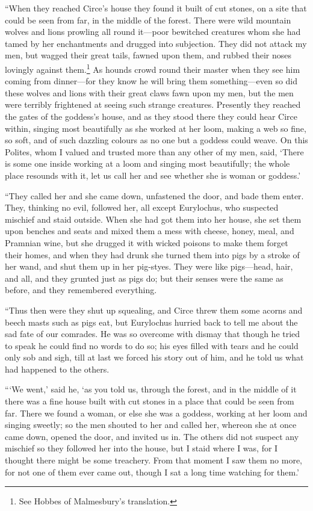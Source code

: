 “When they reached Circe’s house they found it built of cut stones, on a site
that could be seen from far, in the middle of the forest. There were wild
mountain wolves and lions prowling all round it—poor bewitched creatures whom
she had tamed by her enchantments and drugged into subjection. They did not
attack my men, but wagged their great tails, fawned upon them, and rubbed their
noses lovingly against them.\footnote{See Hobbes of Malmesbury’s translation.} As hounds crowd round their master
when they see him coming from dinner—for they know he will bring them
something—even so did these wolves and lions with their great claws fawn upon
my men, but the men were terribly frightened at seeing such strange creatures.
Presently they reached the gates of the goddess’s house, and as they stood
there they could hear Circe within, singing most beautifully as she worked at
her loom, making a web so fine, so soft, and of such dazzling colours as no one
but a goddess could weave. On this Polites, whom I valued and trusted more than
any other of my men, said, ‘There is some one inside working at a loom and
singing most beautifully; the whole place resounds with it, let us call her and
see whether she is woman or goddess.’

“They called her and she came down, unfastened the door, and bade them enter.
They, thinking no evil, followed her, all except Eurylochus, who suspected
mischief and staid outside. When she had got them into her house, she set them
upon benches and seats and mixed them a mess with cheese, honey, meal, and
Pramnian wine, but she drugged it with wicked poisons to make them forget their
homes, and when they had drunk she turned them into pigs by a stroke of her
wand, and shut them up in her pig-styes. They were like pigs—head, hair, and
all, and they grunted just as pigs do; but their senses were the same as
before, and they remembered everything.

“Thus then were they shut up squealing, and Circe threw them some acorns and
beech masts such as pigs eat, but Eurylochus hurried back to tell me about the
sad fate of our comrades. He was so overcome with dismay that though he tried
to speak he could find no words to do so; his eyes filled with tears and he
could only sob and sigh, till at last we forced his story out of him, and he
told us what had happened to the others.

“‘We went,’ said he, ‘as you told us, through the forest, and in the middle of
it there was a fine house built with cut stones in a place that could be seen
from far. There we found a woman, or else she was a goddess, working at her
loom and singing sweetly; so the men shouted to her and called her, whereon she
at once came down, opened the door, and invited us in. The others did not
suspect any mischief so they followed her into the house, but I staid where I
was, for I thought there might be some treachery. From that moment I saw them
no more, for not one of them ever came out, though I sat a long time watching
for them.’

